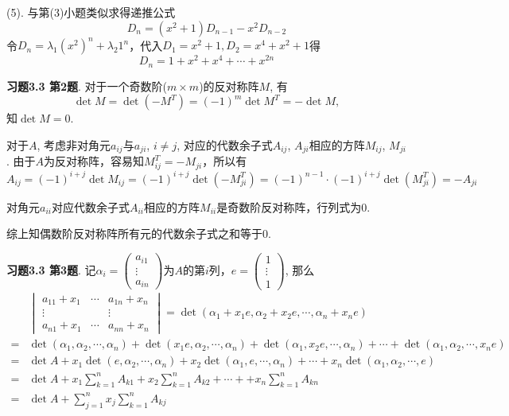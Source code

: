 (5). 与第(3)小题类似求得递推公式
$$D_n = (x^2+1)D_{n-1} - x^2D_{n-2}$$
令$D_n = \lambda_1 (x^2)^n + \lambda_2 1^n$，代入$D_1 = x^2+1, D_2 = x^4 + x^2 + 1$得
$$D_n = 1+x^2+x^4+\cdots+x^{2n}$$

\newpageorvspace

{\bf 习题3.3 第2题}. 对于一个奇数阶($m\times m$)的反对称阵$M$, 有
$$\det M = \det (-M^T) = (-1)^{m}\det M^T = -\det M,$$
知$\det M = 0$.

对于$A$, 考虑非对角元$a_{ij}$与$a_{ji}$, $i\neq j$, 对应的代数余子式$A_{ij}$, $A_{ji}$相应的方阵$M_{ij}$, $M_{ji}$. 由于$A$为反对称阵，容易知$M_{ij}^T = - M_{ji}$，所以有
$$A_{ij} = (-1)^{i+j}\det M_{ij} = (-1)^{i+j}\det (-M_{ji}^T) = (-1)^{n-1}\cdot(-1)^{i+j}\det (M_{ji}^T) = -A_{ji}$$

对角元$a_{ii}$对应代数余子式$A_{ii}$相应的方阵$M_{ii}$是奇数阶反对称阵，行列式为$0$.

综上知偶数阶反对称阵所有元的代数余子式之和等于$0$.

\newpageorvspace

{\bf 习题3.3 第3题}. 记$\alpha_i = \begin{pmatrix} a_{i1} \\ \vdots \\ a_{in} \end{pmatrix}$为$A$的第$i$列，$e = \begin{pmatrix} 1 \\ \vdots \\ 1 \end{pmatrix}$, 那么
\begin{align*}
& \begin{vmatrix} a_{11} + x_1 & \cdots & a_{1n} + x_n \\ \vdots & & \vdots \\ a_{n1} + x_1 & \cdots & a_{nn} + x_n \end{vmatrix} = \det (\alpha_1+x_1e, \alpha_2+x_2e, \cdots, \alpha_n+x_ne) \\
= & \det(\alpha_1, \alpha_2, \cdots, \alpha_n) + \det(x_1e, \alpha_2, \cdots, \alpha_n) + \det(\alpha_1, x_2e, \cdots, \alpha_n) + \cdots + \det(\alpha_1, \alpha_2, \cdots, x_ne) \\
= & \det A + x_1\det(e, \alpha_2, \cdots, \alpha_n) + x_2\det(\alpha_1, e, \cdots, \alpha_n) + \cdots + x_n\det(\alpha_1, \alpha_2, \cdots, e) \\
= & \det A + x_1\sum_{k=1}^nA_{k1} + x_2\sum_{k=1}^nA_{k2} + \cdots + + x_n\sum_{k=1}^nA_{kn} \\
= & \det A + \sum_{j=1}^n x_j \sum_{k=1}^nA_{kj}
\end{align*}



